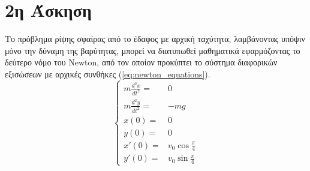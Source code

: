 \documentclass[assignment4.tex]{subfiles}
\begin{document}
\section*{2η Άσκηση}
Το πρόβλημα ρίψης σφαίρας από το έδαφος με αρχική ταχύτητα, λαμβάνοντας υπόψιν μόνο την δύναμη της βαρύτητας, μπορεί να διατυπωθεί μαθηματικά εφαρμόζοντας το δεύτερο νόμο του \textlatin{Newton}, από τον οποίον προκύπτει το σύστημα διαφορικών εξισώσεων με αρχικές συνθήκες (\ref{eq:newton_equations}).
\begin{equation}
\left\{
	\begin{matrix}
	m\frac{d^2x}{dt^2} =& 0 \\
	m\frac{d^2y}{dt^2} =& -mg \\
	x(0) =& 0 \\
	y(0) =& 0 \\
	x'(0) =& v_0 \cos \frac{\pi}{4} \\
	y'(0) =& v_0 \sin \frac{\pi}{4}
	\end{matrix}
\right.
\label{eq:newton_equations}
\end{equation}
\end{document}
